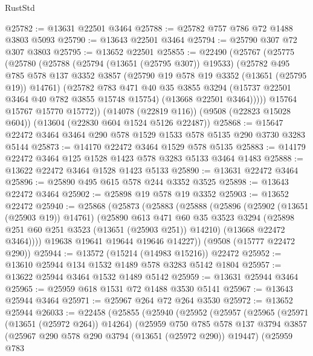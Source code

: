 \begin{lexlean}{RustStd}
\begin{coremodule}
@25782 := @13631 @22501 @3464
@25788 := @25782 @757 @786 @72 @1488 @3803 @5093
@25790 := @13643 @22501 @3464
@25794 := @25790 @307 @72 @307 @3803
@25795 := @13652 @22501
@25855 := @22490
    (@25767
      (@25775
        (@25780
          (@25788
            (@25794 (@13651 (@25795 @307)) @19533)
            (@25782
              @495
              @785
              @578
              @137
              @3352
              @3857
              (@25790 @19 @578 @19 @3352 (@13651 (@25795 @19)) @14761)
              (@25782
                @783
                @471
                @40
                @35
                @3855
                @3294
                (@15737 @22501 @3464 @40 @782 @3855 @15748 @15754)
                (@13668 @22501 @3464)))))
        @15764
        @15767
        @15770
        @15772))
    (@14078 (@22819 @116))
    (@9508 (@22823 @15028 @604))
    (@13604 (@22830 @604 @1524 @5126 @22487))
@25868 := @15647 @22472 @3464 @3464 @290 @578 @1529 @1533 @578 @5135 @290 @3730 @3283 @5144
@25873 := @14170 @22472 @3464 @1529 @578 @5135
@25883 := @14179 @22472 @3464 @125 @1528 @1423 @578 @3283 @5133 @3464 @1483
@25888 := @13622 @22472 @3464 @1528 @1423 @5133
@25890 := @13631 @22472 @3464
@25896 := @25890 @495 @615 @578 @244 @3352 @3525
@25898 := @13643 @22472 @3464
@25902 := @25898 @19 @578 @19 @3352
@25903 := @13652 @22472
@25940 := @25868
    (@25873
      (@25883
        (@25888
          (@25896
            (@25902 (@13651 (@25903 @19)) @14761)
            (@25890
              @613
              @471
              @60
              @35
              @3523
              @3294
              (@25898 @251 @60 @251 @3523 (@13651 (@25903 @251)) @14210)
              (@13668 @22472 @3464))))
        @19638
        @19641
        @19644
        @19646
        @14227))
    (@9508 (@15777 @22472 @290))
@25944 := @13572 (@15214 (@14983 @15216)) @22472
@25952 := @13610 @25944 @134 @1532 @1489 @578 @3283 @5142 @1804
@25957 := @13622 @25944 @3464 @1532 @1489 @5142
@25959 := @13631 @25944 @3464
@25965 := @25959 @618 @1531 @72 @1488 @3530 @5141
@25967 := @13643 @25944 @3464
@25971 := @25967 @264 @72 @264 @3530
@25972 := @13652 @25944
@26033 := @22458
    (@25855
      (@25940
        (@25952
          (@25957
            (@25965
              (@25971 (@13651 (@25972 @264)) @14264)
              (@25959
                @750
                @785
                @578
                @137
                @3794
                @3857
                (@25967 @290 @578 @290 @3794 (@13651 (@25972 @290)) @19447)
                (@25959
                  @783

\end{coremodule}
\end{lexlean}
